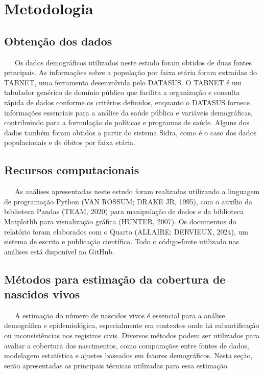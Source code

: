\documentclass[
  12pt,
  a4paper,
]{scrreprt}
\begin{document}
\chapter{Metodologia}\label{metodologia}

\section{Obtenção dos dados}\label{obtenuxe7uxe3o-dos-dados}

~~~Os dados demográficos utilizados neste estudo foram obtidos de duas
fontes principais. As informações sobre a população por faixa etária
foram extraídas do TABNET, uma ferramenta desenvolvida pelo DATASUS. O
TABNET é um tabulador genérico de domínio público que facilita a
organização e consulta rápida de dados conforme os critérios definidos,
enquanto o DATASUS fornece informações essenciais para a análise da
saúde pública e variáveis demográficas, contribuindo para a formulação
de políticas e programas de saúde. Alguns dos dados também foram obtidos
a partir do sistema Sidra, como é o caso dos dados populacionais e de
óbitos por faixa etária.

\section{Recursos computacionais}\label{recursos-computacionais}

~~~As análises apresentadas neste estudo foram realizadas utilizando a
linguagem de programação Python (VAN ROSSUM; DRAKE JR, 1995), com o
auxílio da biblioteca Pandas (TEAM, 2020) para manipulação de dados e da
biblioteca Matplotlib para visualização gráfica (HUNTER, 2007). Os
documentos do relatório foram elaborados com o Quarto (ALLAIRE;
DERVIEUX, 2024), um sistema de escrita e publicação científica. Todo o
código-fonte utilizado nas análises está disponível no GitHub.

\section{Métodos para estimação da cobertura de nascidos
vivos}\label{muxe9todos-para-estimauxe7uxe3o-da-cobertura-de-nascidos-vivos}

~~~A estimação do número de nascidos vivos é essencial para a análise
demográfica e epidemiológica, especialmente em contextos onde há
subnotificação ou inconsistências nos registros civis. Diversos métodos
podem ser utilizados para avaliar a cobertura dos nascimentos, como
comparações entre fontes de dados, modelagem estatística e ajustes
baseados em fatores demográficos. Nesta seção, serão apresentadas as
principais técnicas utilizadas para essa estimação.
\end{document}
